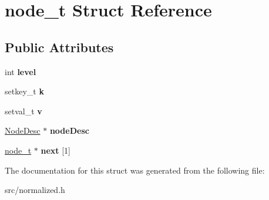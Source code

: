 \hypertarget{structnode__t}{}\section{node\+\_\+t Struct Reference}
\label{structnode__t}
\subsection*{Public Attributes}
\begin{DoxyCompactItemize}
\item 
\mbox{\label{structnode__t_aea0bf952e2a3c84777c04ff7a76321f8}} 
int {\bfseries level}
\item 
\mbox{\label{structnode__t_ab851bf8495cbb6ec9249dd9c1444ee34}} 
setkey\+\_\+t {\bfseries k}
\item 
\mbox{\label{structnode__t_a5916706b9b39ffacdcaeee08f063d00d}} 
setval\+\_\+t {\bfseries v}
\item 
\mbox{\label{structnode__t_a02362ef9d6faa3af1fbe7bbf53ef4111}} 
\mbox{\hyperlink{structNodeDesc}{Node\+Desc}} $\ast$ {\bfseries node\+Desc}
\item 
\mbox{\label{structnode__t_a294f71ce3f5b22412a1291a353f0acf1}} 
\mbox{\hyperlink{structnode__t}{node\+\_\+t}} $\ast$ {\bfseries next} \mbox{[}1\mbox{]}
\end{DoxyCompactItemize}


The documentation for this struct was generated from the following file\+:\begin{DoxyCompactItemize}
\item 
src/normalized.\+h\end{DoxyCompactItemize}
